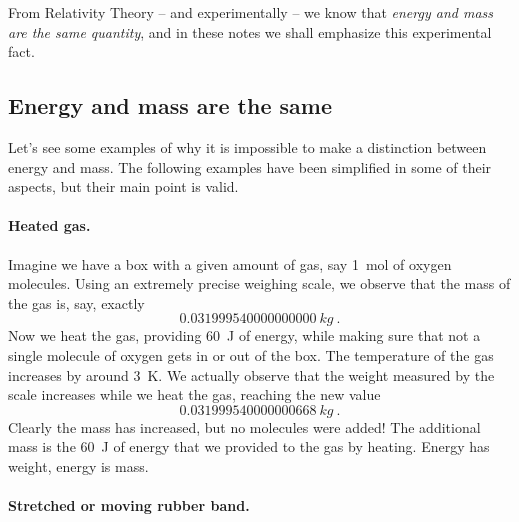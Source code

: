 \documentclass[a4paper,12pt,%
onecolumn,oneside,%
british%
]{memoir}
\renewcommand*{\|}[1][]{\nonscript\:#1\vert\nonscript\:\mathopen{}}
\begin{document}
From Relativity Theory -- and experimentally -- we know that \emph{energy and mass are the same quantity}, and in these notes we shall emphasize this experimental fact.


\subsection{Energy and mass are the same}
\label{sec:mass_is_energy}

Let's see some examples of why it is impossible to make a distinction between energy and mass. The following examples have been simplified in some of their aspects, but their main point is valid.

\paragraph{Heated gas.}

Imagine we have a box with a given amount of gas, say \qty{1}{mol} of oxygen molecules. Using an extremely precise weighing scale, we observe that the mass of the gas is, say, exactly
\begin{equation*}
  \qty{0.031999540000000000}{kg} \ .
\end{equation*}
Now we heat the gas, providing \qty{60}{J} of energy, while making sure that not a single molecule of oxygen gets in or out of the box. The temperature of the gas increases by around \qty{3}{K}. We actually observe that the weight measured by the scale increases while we heat the gas, reaching the new value
\begin{equation*}
  \qty{0.031999540000000668}{kg} \ .
\end{equation*}
Clearly the mass has increased, but no molecules were added! The additional mass is the \qty{60}{J} of energy that we provided to the gas by heating. Energy has weight, energy is mass.


\paragraph{Stretched or moving rubber band.}
\end{document}
